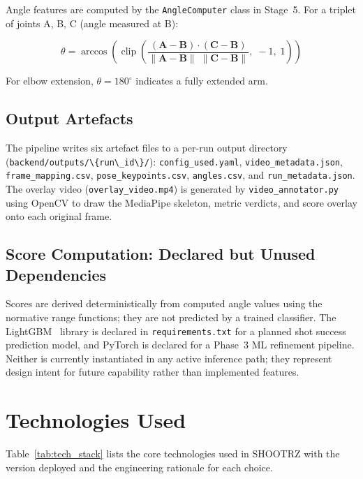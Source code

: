 Angle features are computed by the \lstinline|AngleComputer| class in Stage~5. For a triplet of joints A, B, C (angle measured at B):

\begin{equation}
  \theta = \arccos\!\left(\operatorname{clip}\!\left(\frac{(\mathbf{A}-\mathbf{B})\cdot(\mathbf{C}-\mathbf{B})}{\|\mathbf{A}-\mathbf{B}\|\;\|\mathbf{C}-\mathbf{B}\|},\; -1,\; 1\right)\right)
\end{equation}

For elbow extension, $\theta = 180^{\circ}$ indicates a fully extended arm.

\subsection{Output Artefacts}

The pipeline writes six artefact files to a per-run output directory (\lstinline|backend/outputs/\{run\_id\}/|): \lstinline|config_used.yaml|, \lstinline|video_metadata.json|, \lstinline|frame_mapping.csv|, \lstinline|pose_keypoints.csv|, \lstinline|angles.csv|, and \lstinline|run_metadata.json|. The overlay video (\lstinline|overlay_video.mp4|) is generated by \lstinline|video_annotator.py| using OpenCV to draw the MediaPipe skeleton, metric verdicts, and score overlay onto each original frame.

\subsection{Score Computation: Declared but Unused Dependencies}

Scores are derived deterministically from computed angle values using the normative range functions; they are not predicted by a trained classifier. The LightGBM~\cite{Ke2017} library is declared in \lstinline|requirements.txt| for a planned shot success prediction model, and PyTorch is declared for a Phase~3 ML refinement pipeline. Neither is currently instantiated in any active inference path; they represent design intent for future capability rather than implemented features.

\section{Technologies Used}
\label{sec:technologies}

Table~\ref{tab:tech_stack} lists the core technologies used in SHOOTRZ with the version deployed and the engineering rationale for each choice.

